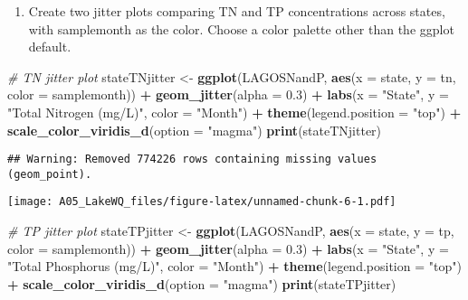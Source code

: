 \documentclass[]{article}
\newenvironment{Shaded}{\begin{snugshade}}{\end{snugshade}}
\newcommand{\CommentTok}[1]{\textcolor[rgb]{0.56,0.35,0.01}{\textit{#1}}}
\newcommand{\DataTypeTok}[1]{\textcolor[rgb]{0.13,0.29,0.53}{#1}}
\newcommand{\FloatTok}[1]{\textcolor[rgb]{0.00,0.00,0.81}{#1}}
\newcommand{\KeywordTok}[1]{\textcolor[rgb]{0.13,0.29,0.53}{\textbf{#1}}}
\newcommand{\NormalTok}[1]{#1}
\newcommand{\OperatorTok}[1]{\textcolor[rgb]{0.81,0.36,0.00}{\textbf{#1}}}
\newcommand{\StringTok}[1]{\textcolor[rgb]{0.31,0.60,0.02}{#1}}
\providecommand{\tightlist}{%
  \setlength{\itemsep}{0pt}\setlength{\parskip}{0pt}}
\begin{document}
\begin{enumerate}
\def\labelenumi{\arabic{enumi}.}
\setcounter{enumi}{9}
\tightlist
\item
  Create two jitter plots comparing TN and TP concentrations across
  states, with samplemonth as the color. Choose a color palette other
  than the ggplot default.
\end{enumerate}

\begin{Shaded}
\begin{Highlighting}[]
\CommentTok{# TN jitter plot}
\NormalTok{stateTNjitter <-}\StringTok{ }\KeywordTok{ggplot}\NormalTok{(LAGOSNandP, }\KeywordTok{aes}\NormalTok{(}\DataTypeTok{x =}\NormalTok{ state, }\DataTypeTok{y =}\NormalTok{ tn, }\DataTypeTok{color =}\NormalTok{ samplemonth)) }\OperatorTok{+}
\StringTok{  }\KeywordTok{geom_jitter}\NormalTok{(}\DataTypeTok{alpha =} \FloatTok{0.3}\NormalTok{) }\OperatorTok{+}
\StringTok{  }\KeywordTok{labs}\NormalTok{(}\DataTypeTok{x =} \StringTok{"State"}\NormalTok{, }\DataTypeTok{y =} \StringTok{"Total Nitrogen (mg/L)"}\NormalTok{, }\DataTypeTok{color =} \StringTok{"Month"}\NormalTok{) }\OperatorTok{+}
\StringTok{  }\KeywordTok{theme}\NormalTok{(}\DataTypeTok{legend.position =} \StringTok{"top"}\NormalTok{) }\OperatorTok{+}
\StringTok{  }\KeywordTok{scale_color_viridis_d}\NormalTok{(}\DataTypeTok{option =} \StringTok{"magma"}\NormalTok{)}
\KeywordTok{print}\NormalTok{(stateTNjitter)}
\end{Highlighting}
\end{Shaded}

\begin{verbatim}
## Warning: Removed 774226 rows containing missing values (geom_point).
\end{verbatim}

\texttt{[image: A05\_LakeWQ\_files/figure-latex/unnamed-chunk-6-1.pdf]}

\begin{Shaded}
\begin{Highlighting}[]
\CommentTok{# TP jitter plot}
\NormalTok{stateTPjitter <-}\StringTok{ }\KeywordTok{ggplot}\NormalTok{(LAGOSNandP, }\KeywordTok{aes}\NormalTok{(}\DataTypeTok{x =}\NormalTok{ state, }\DataTypeTok{y =}\NormalTok{ tp, }\DataTypeTok{color =}\NormalTok{ samplemonth)) }\OperatorTok{+}
\StringTok{  }\KeywordTok{geom_jitter}\NormalTok{(}\DataTypeTok{alpha =} \FloatTok{0.3}\NormalTok{) }\OperatorTok{+}
\StringTok{  }\KeywordTok{labs}\NormalTok{(}\DataTypeTok{x =} \StringTok{"State"}\NormalTok{, }\DataTypeTok{y =} \StringTok{"Total Phosphorus (mg/L)"}\NormalTok{, }\DataTypeTok{color =} \StringTok{"Month"}\NormalTok{) }\OperatorTok{+}
\StringTok{  }\KeywordTok{theme}\NormalTok{(}\DataTypeTok{legend.position =} \StringTok{"top"}\NormalTok{) }\OperatorTok{+}
\StringTok{  }\KeywordTok{scale_color_viridis_d}\NormalTok{(}\DataTypeTok{option =} \StringTok{"magma"}\NormalTok{)}
\KeywordTok{print}\NormalTok{(stateTPjitter)}
\end{Highlighting}
\end{Shaded}
\end{document}
